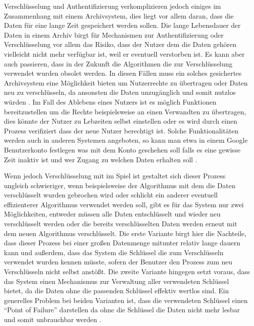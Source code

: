 \documentclass[conference,compsoc,final,a4paper]{IEEEtran}
\begin{document}
Verschlüsselung und Authentifizierung verkomplizieren jedoch einiges im Zusammenhang mit einem Archivsystem, dies liegt vor allem daran, dass die Daten für eine lange Zeit gespeichert werden sollen. Die lange Lebensdauer der Daten in einem Archiv birgt für Mechanismen zur Authentifizierung oder Verschlüsselung vor allem das Risiko, dass der Nutzer dem die Daten gehören vielleicht nicht mehr verfügbar ist, weil er eventuell verstorben ist. Es kann aber auch passieren, dass in der Zukunft die Algorithmen die zur Verschlüsselung verwendet wurden obsolet werden. In diesen Fällen muss ein solches gesichertes Archivsystem eine Möglichkeit bieten um Nutzerrechte zu übertragen oder Daten neu zu verschlüsseln, da ansonsten die Daten unzugänglich und somit nutzlos würden \autocite{Storer2006}. Im Fall des Ablebens eines Nutzers ist es möglich Funktionen bereitzustellen um die Rechte beispielsweise an einen Verwandten zu übertragen, dies könnte der Nutzer zu Lebzeiten selbst einstellen oder es wird durch einen Prozess verifiziert dass der neue Nutzer berechtigt ist. Solche Funktionalitäten werden auch in anderen Systemen angeboten, so kann man etwa in einem Google Benutzerkonto festlegen was mit dem Konto geschehen soll falls es eine gewisse Zeit inaktiv ist und wer Zugang zu welchen Daten erhalten soll \autocite{GoogleKontoaktivität}.

Wenn jedoch Verschlüsselung mit im Spiel ist gestaltet sich dieser Prozess ungleich schwieriger, wenn beispielsweise der Algorithmus mit dem die Daten verschlüsselt wurden gebrochen wird oder schlicht ein anderer eventuell effizienterer Algorithmus verwendet werden soll, gibt es für das System nur zwei Möglichkeiten, entweder müssen alle Daten entschlüsselt und wieder neu verschlüsselt werden oder die bereits verschlüsselten Daten werden erneut mit dem neuen Algorithmus verschlüsselt. Die erste Variante birgt hier die Nachteile, dass dieser Prozess bei einer großen Datenmenge mitunter relativ lange dauern kann und außerdem, dass das System die Schlüssel die zum Verschlüsseln verwendet wurden kennen müsste, sofern der Benutzer den Prozess zum neu Verschlüsseln nicht selbst anstößt. Die zweite Variante hingegen setzt voraus, dass das System einen Mechanismus zur Verwaltung aller verwendeten Schlüssel bietet, da die Daten ohne die passenden Schlüssel effektiv wertlos sind. Ein generelles Problem bei beiden Varianten ist, dass die verwendeten Schlüssel einen \enquote{Point of Failure} darstellen da ohne die Schlüssel die Daten nicht mehr lesbar und somit unbrauchbar werden \autocite{Storer2006}.
\end{document}
